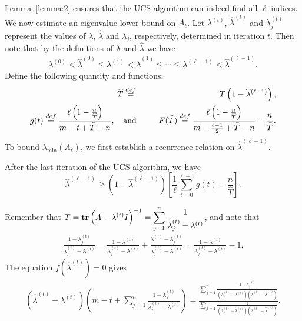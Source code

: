 \documentclass[final,leqno,onefignum,onetabnum]{siamltex1213}
\begin{document}
Lemma~\ref{lemma:2} ensures that the UCS algorithm can
indeed find all $\ell$ indices. We now estimate an eigenvalue lower
bound on $A_{\ell}$. Let $\lambda^{(t)}$, $\widehat{\lambda}^{(t)}$
and $\lambda_j^{(t)}$ represent the values of $\lambda$,
$\widehat{\lambda}$ and $\lambda_j$, respectively, determined in
iteration $t$.  Then note that by the definitions of $\lambda$ and
$\widehat{\lambda}$ we have
\begin{eqnarray}
\lambda^{(0)}<\widehat{\lambda}^{(0)}\le\lambda^{(1)}<\widehat{\lambda}^{(1)}\le\cdots\le\lambda^{(\ell - 1)}<\widehat{\lambda}^{(\ell - 1)}.\nonumber
\end{eqnarray}
Define the following quantity and functions:
\begin{eqnarray}
\widehat{T} &\stackrel{def}=& T \left( 1 - \widehat{\lambda}^{(\ell-1)} \right) \label{def:T}, \\
g(t) \stackrel{def}= \frac{\ell\left( 1 - \frac{n}{\widehat{T}} \right)}{m-t+\widehat{T}-n}, \hspace{0.4cm}  &\text{and}& \hspace{0.6cm} F(\widehat{T}) \stackrel{def}= \frac{\ell \left(1-\frac{n}{\widehat{T}}\right)}{m-\frac{\ell -
1}{2}+\widehat{T}-n}-\frac{n}{\widehat{T}}. \nonumber
\end{eqnarray}
To bound $\lambda_{\text{min}}\left(A_{\ell}\right)$, we first establish a recurrence relation on $\widehat{\lambda}^{(\ell-1)}$. 
\begin{lemma} \label{lem:tech}
After the last iteration of the UCS algorithm, we have
\[ \widehat{\lambda}^{(\ell-1)} \geq \left( 1 - \widehat{\lambda}^{(\ell-1)} \right) \left[ \frac{1}{\ell} \sum_{t=0}^{\ell-1} g\left( t \right) - \frac{n}{\widehat{T}} \right].\]
\end{lemma}
\proof
Remember that ${\displaystyle T = \text{\bf tr} \left( A- \lambda^{(t)}I \right)^{-1} =  \sum_{j=1}^n\frac{1}{\lambda^{(t)}_j-\lambda^{(t)}}}$, and note that 
\begin{eqnarray}
{\displaystyle \frac{1-\lambda_j^{(t)}}{\lambda_j^{(t)}-\lambda^{(t)}} = \frac{1-\lambda^{(t)}}{\lambda_j^{(t)}-\lambda^{(t)}} + \frac{\lambda^{(t)}-\lambda_j^{(t)}}{\lambda_j^{(t)}-\lambda^{(t)}} = \frac{1-\lambda^{(t)}}{\lambda_j^{(t)}-\lambda^{(t)}} - 1. \label{eqn:part}}
\end{eqnarray}
The equation $f\left( \widehat{\lambda}^{(t)} \right) = 0$ gives
\begin{eqnarray}
{\displaystyle \left(\widehat{\lambda}^{(t)}-\lambda^{(t)}\right)\left(m-t+\sum_{j=1}^n\frac{1-\lambda_j^{(t)}}{\lambda_j^{(t)}-\lambda^{(t)}}\right)=\frac{\sum_{j=1}^n\frac{1-\lambda_j^{(t)}}{\left(\lambda_j^{(t)}-\lambda^{(t)}\right)\left(\lambda_j^{(t)}-\widehat{\lambda}^{(t)}\right)}}{\sum_{j=1}^n\frac{1}{\left(\lambda_j^{(t)}-\lambda^{(t)}\right)\left(\lambda^{(t)}_j-\widehat{\lambda}^{(t)}\right)}}}.\nonumber
\end{eqnarray}
\end{document}
